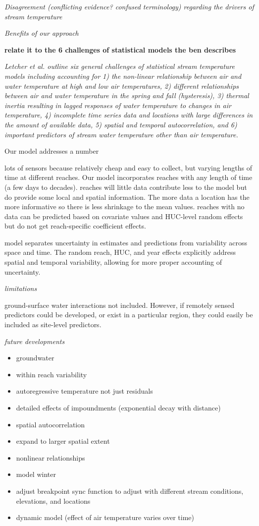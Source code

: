 \documentclass[]{article}
\providecommand{\tightlist}{%
  \setlength{\itemsep}{0pt}\setlength{\parskip}{0pt}}
\begin{document}
\emph{Disagreement (conflicting evidence? confused terminology)
regarding the drivers of stream temperature}

\emph{Benefits of our approach}

\textbf{relate it to the 6 challenges of statistical models the ben
describes}

\emph{Letcher et al. \citeyearpar{Letcher2015} outline six general
challenges of statistical stream temperature models including accounting
for 1) the non-linear relationship between air and water temperature at
high and low air temperatures, 2) different relationships between air
and water temperature in the spring and fall (hysteresis), 3) thermal
inertia resulting in lagged responses of water temperature to changes in
air temperature, 4) incomplete time series data and locations with large
differences in the amount of available data, 5) spatial and temporal
autocorrelation, and 6) important predictors of stream water temperature
other than air temperature.}

Our model addresses a number

lots of sensors because relatively cheap and easy to collect, but
varying lengths of time at different reaches. Our model incorporates
reaches with any length of time (a few days to decades). reaches will
little data contribute less to the model but do provide some local and
spatial information. The more data a location has the more informative
so there is less shrinkage to the mean values. reaches with no data can
be predicted based on covariate values and HUC-level random effects but
do not get reach-specific coefficient effects.

model separates uncertainty in estimates and predictions from
variability across space and time. The random reach, HUC, and year
effects explicitly address spatial and temporal variability, allowing
for more proper accounting of uncertainty.

\emph{limitations}

ground-surface water interactions not included. However, if remotely
sensed predictors could be developed, or exist in a particular region,
they could easily be included as site-level predictors.

\emph{future developments}

\begin{itemize}
\tightlist
\item
  groundwater
\item
  within reach variability
\item
  autoregressive temperature not just residuals
\item
  detailed effects of impoundments (exponential decay with distance)
\item
  spatial autocorrelation
\item
  expand to larger spatial extent
\item
  nonlinear relationships
\item
  model winter
\item
  adjust breakpoint sync function to adjust with different stream
  conditions, elevations, and locations
\item
  dynamic model (effect of air temperature varies over time)
\end{itemize}
\end{document}

